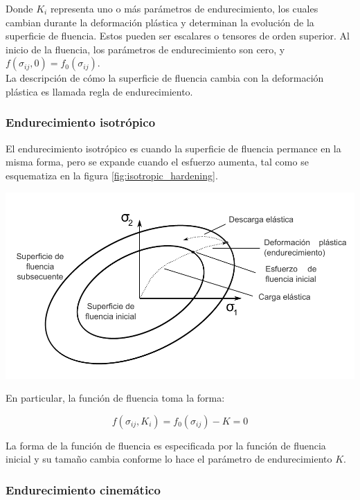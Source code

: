 Donde $K_i$ representa uno o más parámetros de endurecimiento, los cuales cambian durante la 
deformación plástica y determinan la evolución de la superficie de fluencia. Estos pueden 
ser escalares o tensores de orden superior. Al inicio de la fluencia, los parámetros de 
endurecimiento son cero, y $f(\sigma_{ij}, 0) = f_0(\sigma_{ij}) $. \\

La descripción de cómo la superficie de fluencia cambia con la deformación plástica es 
llamada regla de endurecimiento. 

\subsubsection{Endurecimiento isotrópico}

El endurecimiento isotrópico es cuando la superficie de fluencia permance en la misma forma, 
pero se expande cuando el esfuerzo aumenta, tal como se esquematiza en la figura \ref{fig:isotropic_hardening}.

\begin{center}
\includegraphics[scale=0.8]{src/ch2/isotropic_hardening}
\label{fig:isotropic_hardening}
\end{center}

En particular, la función de fluencia toma la forma:

\begin{equation}
f(\sigma_{ij}, K_i) = f_0 ( \sigma_{ij} ) - K = 0
\end{equation}

La forma de la función de fluencia es especificada por la función de fluencia inicial y su 
tamaño cambia conforme lo hace el parámetro de endurecimiento $K$.


\subsubsection{Endurecimiento cinemático}

